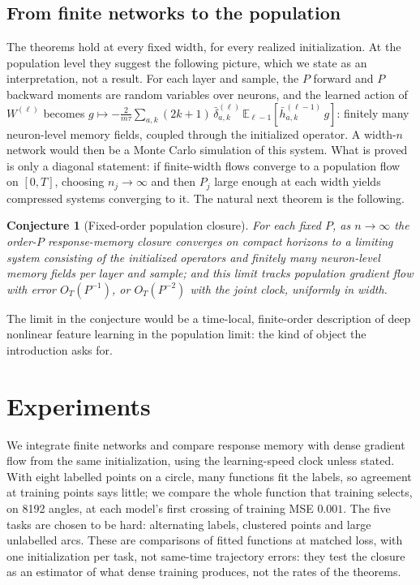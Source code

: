 \documentclass[11pt]{article}
\newtheorem{conjecture}[theorem]{Conjecture}
\theoremstyle{definition}
\theoremstyle{remark}
\newcommand{\E}{\mathbb{E}}
\begin{document}
\subsection{From finite networks to the population}
\label{sec:population-view}

The theorems hold at every fixed width, for every realized initialization.  At
the population level they suggest the following picture, which we state as an
interpretation, not a result.  For each layer and sample, the $P$ forward and
$P$ backward moments are random variables over neurons, and the learned action
of $W^{(\ell)}$ becomes
$g\mapsto-\frac{2}{m\tau}\sum_{a,k}(2k+1)\,\bar\delta^{(\ell)}_{a,k}\,
\E_{\ell-1}[\bar h^{(\ell-1)}_{a,k}\,g]$: finitely many neuron-level memory
fields, coupled through the initialized operator.  A width-$n$ network would then
be a Monte Carlo simulation of this system.  What is proved is only a diagonal
statement: if finite-width flows converge to a population flow on $[0,T]$,
choosing $n_j\to\infty$ and then $P_j$ large enough at each width yields
compressed systems converging to it.  The natural next theorem is the following.

\begin{conjecture}[Fixed-order population closure]
\label{conj:population}
For each fixed $P$, as $n\to\infty$ the order-$P$ response-memory closure
converges on compact horizons to a limiting system consisting of the initialized
operators and finitely many neuron-level memory fields per layer and sample; and
this limit tracks population gradient flow with error $O_T(P^{-1})$, or
$O_T(P^{-2})$ with the joint clock, uniformly in width.
\end{conjecture}

The limit in the conjecture would be a time-local, finite-order description of
deep nonlinear feature learning in the population limit: the kind of object the
introduction asks for.

\section{Experiments}
\label{sec:experiments}

We integrate finite networks and compare response memory with dense gradient
flow from the same initialization, using the learning-speed clock unless stated.
With eight labelled points on a circle, many functions fit the labels, so
agreement at training points says little; we compare the whole function that
training selects, on 8192 angles, at each model's first crossing of training MSE
$0.001$.  The five tasks are chosen to be hard: alternating labels, clustered
points and large unlabelled arcs.  These are comparisons of fitted functions at
matched loss, with one initialization per task, not same-time trajectory errors:
they test the closure as an estimator of what dense training produces, not the
rates of the theorems.
\end{document}
